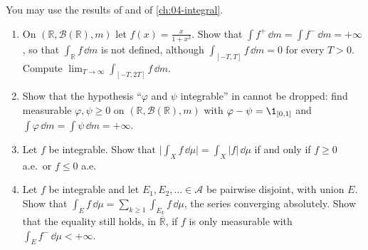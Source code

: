 
\begin{exercise}\label{ex:ig-signed}
\easy You may use the results of  and of \cref{ch:04-integral}.
\begin{enumerate}[label=(\alph*)]
  \item On $(\mathbb R,\mathcal B(\mathbb R),m)$ let $f(x)=\frac x{1+x^2}$. Show that
    $\int f^+\,\dd m=\int f^-\,\dd m=+\infty$, so that $\int_{\mathbb R}f\,\dd m$ is not defined,
    although $\int_{[-T,T]}f\,\dd m=0$ for every $T>0$. Compute
    $\lim_{T\to\infty}\int_{[-T,2T]}f\,\dd m$.
  \item Show that the hypothesis ``$\varphi$ and $\psi$ integrable'' in
     cannot be dropped: find measurable $\varphi,\psi\ge0$ on
    $(\mathbb R,\mathcal B(\mathbb R),m)$ with $\varphi-\psi=\1_{[0,1]}$ and
    $\int\varphi\,\dd m=\int\psi\,\dd m=+\infty$.
  \item Let $f$ be integrable. Show that $\big|\int_Xf\,\dd\mu\big|=\int_X|f|\,\dd\mu$ if and
    only if $f\ge0$ a.e.\ or $f\le0$ a.e.
  \item Let $f$ be integrable and let $E_1,E_2,\ldots\in\mathcal A$ be pairwise disjoint, with
    union $E$. Show that $\int_Ef\,\dd\mu=\sum_{k\ge1}\int_{E_k}f\,\dd\mu$, the series converging
    absolutely. Show that the equality still holds, in $\overline{\mathbb R}$, if $f$ is only
    measurable with $\int_Ef^-\,\dd\mu<+\infty$.
\end{enumerate}
\end{exercise}

